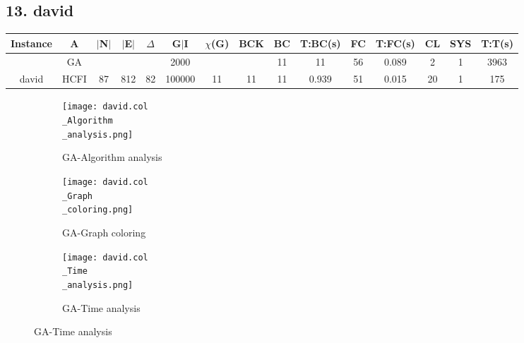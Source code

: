 \documentclass[10pt]{article}
\begin{document}
\subsection*{\hspace{0,9073976cm} 13. david}
\begin{table}[H]
\centering
\begin{tabular}{|c|c|c|c|c|c|c|c|c|c|c|c|c|c|c|}
\hline
Instance& A &$|$N$|$ & $|$E$|$ & $\Delta$ & G$|$I & $\chi$(G) &BCK&BC & T:BC(s) & FC & T:FC(s) & CL & SYS & T:T(s) \\ \hline \hline
&GA&       &                   &                     &2000         &     \cellcolor{yellow} & {\cellcolor{yellow}}& {{\cellcolor{green}11}}
&11   &56        &0.089                   &2                    &1          & 3963       \\ \cline{2-2} \cline{6-6} \cline{9-15}
 \multirow{-2}{*}{david} &HCFI   &\multirow{-2}{*}{87}   &\multirow{-2}{*}{812}     &\multirow{-2}{*}{82}     &100000      &\multirow{-2}{*}{\cellcolor{yellow}11}      & \multirow{-2}{*}{\cellcolor{yellow}11}    &{\cellcolor{green}11}     &0.939         &51    &0.015         &20    &1     & 175       \\ \hline 
\end{tabular}
\end{table}
\graphicspath{{./Core1/Solutions/GA/david.col}}
\begin{figure}[H]
\begin{subfigure}{.33\textwidth}
  \centering
  \texttt{[image: david.col\\\_Algorithm\\\_analysis.png]}
  \caption{GA-Algorithm analysis}
   \label{fig:subfig1}
\end{subfigure}%
\begin{subfigure}{.33\textwidth}
  \centering
  \texttt{[image: david.col\\\_Graph\\\_coloring.png]}
  \caption{GA-Graph coloring}
  \label{fig:subfig2}
\end{subfigure}
\begin{subfigure}{.33\textwidth}
  \centering
  \texttt{[image: david.col\\\_Time\\\_analysis.png]}
  \caption{GA-Time analysis}
  \end{subfigure}
\end{figure}
\end{document}
